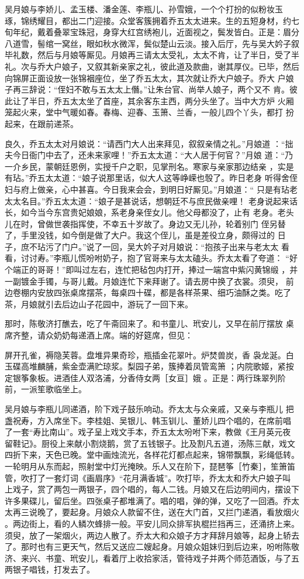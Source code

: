 吴月娘与李娇儿、孟玉楼、潘金莲、李瓶儿、孙雪娥，一个个打扮的似粉妆玉
琢，锦绣耀目，都出二门迎接。众堂客簇拥着乔五太太进来。生的五短身材，约七
旬年纪，戴着叠翠宝珠冠，身穿大红宫绣袍儿，近面视之，鬓发皆白。正是：眉分
八道雪，髻绾一窝丝，眼如秋水微浑，鬓似楚山云淡。接入后厅，先与吴大妗子叙
毕礼数，然后与月娘等厮见。月娘再三请太太受礼，太太不肯，让了半日，受了半
礼。次与乔大户娘子，又叙其新亲家之礼，彼此道及款曲，谢其厚仪。已毕，然后
向锦屏正面设放一张锦裀座位，坐了乔五太太，其次就让乔大户娘子。乔大
户娘子再三辞说：“侄妇不敢与五太太上僭。”让朱台官、尚举人娘子，两个又不
肯。彼此让了半日，乔五太太坐了首座，其余客东主西，两分头坐了。当中大方炉
火厢笼起火来，堂中气暖如春。春梅、迎春、玉箫、兰香，一般儿四个丫头，都打
扮起来，在跟前递茶。

良久，乔五太太对月娘说：“请西门大人出来拜见，叙叙亲情之礼。”月娘道
：“拙夫今日衙门中去了，还未来家哩！”乔五太太道：“大人居于何官？”月娘
道：“乃一介乡民，蒙朝廷恩例，实授千户之职，见掌刑名。寒家与亲家那边结亲
，实是有玷。”乔五太太道：“娘子说那里话，似大人这等峥嵘也彀了。昨日老身
听得舍侄妇与府上做亲，心中甚喜。今日我来会会，到明日好厮见。”月娘道：“
只是有玷老太太名目。”乔五太太道：“娘子是甚说话，想朝廷不与庶民做亲哩！
老身说起来话长，如今当今东宫贵妃娘娘，系老身亲侄女儿。他父母都没了，止有
老身。老头儿在时，曾做世袭指挥使，不幸五十岁故了。身边又无儿孙，轮着别门
侄另替了，手里没钱，如今倒是做了大户。我这个侄儿，虽是差役立身，颇得过的
日子，庶不玷污了门户。”说了一回，吴大妗子对月娘说：“抱孩子出来与老太太
看看，讨讨寿。”李瓶儿慌吩咐奶子，抱了官哥来与太太磕头。乔太太看了夸道：
“好个端正的哥哥！”即叫过左右，连忙把毡包内打开，捧过一端宫中紫闪黄锦缎
，并一副镀金手镯，与哥儿戴。月娘连忙下来拜谢了。请去房中换了衣裳。须臾，
前边卷棚内安放四张桌席摆茶，每桌四十碟，都是各样茶果、细巧油酥之类。吃了
茶，月娘就引去后边山子花园中，游玩了一回下来。

那时，陈敬济打醮去，吃了午斋回来了。和书童儿、玳安儿，又早在前厅摆放
桌席齐整，请众奶奶每递酒上席。端的好筵席，但见：

屏开孔雀，褥隐芙蓉。盘堆异果奇珍，瓶插金花翠叶。炉焚兽炭，香
袅龙涎。白玉碟高堆麟脯，紫金壶满贮琼浆。梨园子弟，簇捧着凤管鸾箫
；内院歌姬，紧按定银筝象板。进酒佳人双洛浦，分香侍女两［女亘］娥
。正是：两行珠翠列阶前，一派笙歌临坐上。

吴月娘与李瓶儿同递酒，阶下戏子鼓乐响动。乔太太与众亲戚，又亲与李瓶儿
把盏祝寿，方入席坐下。李桂姐、吴银儿、韩玉钏儿、董娇儿四个唱的，在席前唱
了一套“寿比南山”。戏子呈上戏文手本，乔五太太吩咐下来，教做《王月英元夜
留鞋记》。厨役上来献小割烧鹅，赏了五钱银子。比及割凡五道，汤陈三献，戏文
四折下来，天色已晚。堂中画烛流光，各样花灯都点起来，锦带飘飘，彩绳低转。
一轮明月从东而起，照射堂中灯光掩映。乐人又在阶下，琵琶筝［竹秦］，笙箫笛
管，吹打了一套灯词《画眉序》“花月满香城”。吹打毕，乔太太和乔大户娘子叫
上戏子，赏了两包一两银子，四个唱的，每人二钱。月娘又在后边明间内，摆设下
许多果碟儿，留后坐。四张桌子都堆满了。唱的唱，弹的弹，又吃了一回酒。乔太
太再三说晚了，要起身。月娘众人款留不住，送在大门首，又拦门递酒，看放烟火
。两边街上，看的人鳞次蜂排一般。平安儿同众排军执棍拦挡再三，还涌挤上来。
须臾，放了一架烟火，两边人散了。乔太大和众娘子方才拜辞月娘等，起身上轿去
了。那时也有三更天气，然后又送应二嫂起身。月娘众姐妹归到后边来，吩咐陈敬
济、来兴、书童、玳安儿，看着厅上收拾家活，管待戏子并两个师范酒饭，与了五
两银子唱钱，打发去了。


